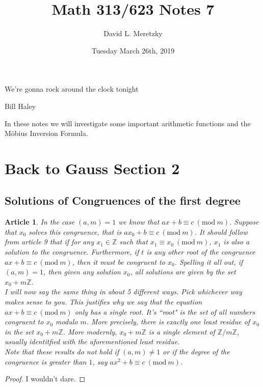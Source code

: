 \documentclass{article}
\title{ \vspace{-10ex} %
Math 313/623 Notes 7
}
\author{David L. Meretzky
}
\date{%
Tuesday March 26th, 2019
}
\theoremstyle{problemstyle}
\newtheorem{article}{Article}
\newcommand{\Mod}[1]{\ (\mathrm{mod}\ #1)}
\begin{document}
\maketitle

\epigraph{We're gonna rock around the clock tonight}{Bill Haley}

In these notes we will investigate some important arithmetic functions and the M\"obius Inversion Formula. 

\section*{Back to Gauss Section 2}

\subsection*{Solutions of Congruences of the first degree}

\setcounter{article}{25}
\begin{article}
In the case $(a,m) = 1$ we know that $ax + b \equiv c \Mod{m}$. Suppose that $x_0$ solves this congruence, that is $ax_0 + b \equiv c \Mod{m}$. It should follow from article 9 that if for any $x_1 \in \mathbb{Z}$ such that  $x_1 \equiv x_0 \Mod{m}$, $x_1$ is also a solution to the congruence. Furthermore, if $t$ is any other root of the congruence $ax + b \equiv c \Mod{m}$, then it must be congruent to $x_0$. Spelling it all out, if $(a,m) = 1$, then given any solution $x_0$, all solutions are given by the set $x_0 + m\mathbb{Z}$.\\

I will now say the same thing in about 5 different ways. Pick whichever way makes sense to you. This justifies why we say that the equation $ax + b \equiv c \Mod{m}$ only has a single root. It's ``root" is the set of all numbers congruent to $x_0$ modulo $m$. More precisely, there is exactly one least residue of $x_0$ in the set $x_0 + m\mathbb{Z}$. More modernly, $x_0 + m\mathbb{Z}$ is a single element of $\mathbb{Z}/m\mathbb{Z}$, usually identitfied with the aforementioned least residue.\\

Note that these results do not hold if $(a,m) \neq 1$ or if the degree of the congruence is greater than $1$, say $ax^2 + b \equiv c \Mod{m}$. 
\end{article}

\begin{proof}
I wouldn't dare. 
\end{proof}
\end{document}
